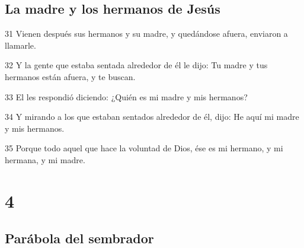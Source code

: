 \section*{La madre y los hermanos de Jesús}

\par 31 Vienen después sus hermanos y su madre, y quedándose afuera, enviaron a llamarle.
\par 32 Y la gente que estaba sentada alrededor de él le dijo: Tu madre y tus hermanos están afuera, y te buscan.
\par 33 El les respondió diciendo: ¿Quién es mi madre y mis hermanos?
\par 34 Y mirando a los que estaban sentados alrededor de él, dijo: He aquí mi madre y mis hermanos.
\par 35 Porque todo aquel que hace la voluntad de Dios, ése es mi hermano, y mi hermana, y mi madre.

\chapter{4}

\section*{Parábola del sembrador}

